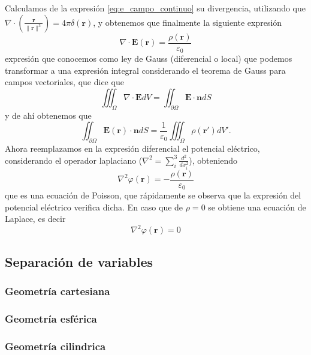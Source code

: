 \documentclass[11pt,a4paper]{article}
\numberwithin{equation}{section}
\begin{document}
Calculamos de la expresión \ref{eq:e_campo_continuo} su divergencia, utilizando que $\nabla \cdot \left(\frac{\textbf{r}}{\|\textbf{r}\|^3}\right) = 4\pi\delta(\textbf{r})$, y obtenemos que finalmente la siguiente expresión
\begin{equation}
    \nabla \cdot \textbf{E}(\textbf{r}) = \frac{\rho(\textbf{r})}{\varepsilon_0}
    \label{eq:e_gauss_dif}
\end{equation}
expresión que conocemos como ley de Gauss (diferencial o local) que podemos transformar a una expresión integral considerando el teorema de Gauss para campos vectoriales, que dice que \[\iiint_{\Omega} \nabla \cdot \textbf{E} dV = \iint_{\partial \Omega} \textbf{E} \cdot \textbf{n} dS\] y de ahí obtenemos que 
\begin{equation}
    \iint_{\partial \Omega} \textbf{E}(\textbf{r}) \cdot \textbf{n} dS = \frac{1}{\varepsilon_0} \iiint_{\Omega} \rho(\textbf{r}') dV'.
    \label{eq:e_gauss_int}
\end{equation}
Ahora reemplazamos en la expresión diferencial el potencial eléctrico, considerando el operador laplaciano ($\displaystyle\nabla^2 = \sum_{i}^3 \frac{d^2}{dx_i^2}$), obteniendo
\begin{equation}
    \nabla^2 \varphi(\textbf{r}) = -\frac{\rho(\textbf{r})}{\varepsilon_0}
    \label{eq:e_poisson}
\end{equation}
que es una ecuación de Poisson, que rápidamente se observa que la expresión del potencial eléctrico verifica dicha. En caso que de $\rho = 0$ se obtiene una ecuación de Laplace, es decir
\begin{equation}
    \nabla^2 \varphi(\textbf{r}) = 0
    \label{eq:e_laplace}
\end{equation}


\subsection{Separación de variables}

\subsubsection{Geometría cartesiana}

\subsubsection{Geometría esférica}

\subsubsection{Geometría cilindrica}
\end{document}

